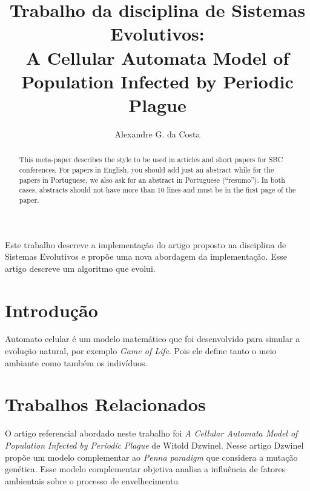 \documentclass[12pt]{article}
\title{Trabalho da disciplina de Sistemas Evolutivos:\\ A Cellular Automata
 Model of Population Infected by Periodic Plague}
\author{Alexandre G. da Costa\inst{1}}
\begin{document}
 

\maketitle

\begin{abstract}
  This meta-paper describes the style to be used in articles and short papers
  for SBC conferences. For papers in English, you should add just an abstract
  while for the papers in Portuguese, we also ask for an abstract in
  Portuguese (``resumo''). In both cases, abstracts should not have more than
  10 lines and must be in the first page of the paper.
\end{abstract}
  
\begin{resumo} 
  Este trabalho descreve a implementação do artigo proposto na disciplina de
  Sistemas Evolutivos e propõe uma nova abordagem da implementação. Esse
  artigo descreve um algoritmo que evolui.
\end{resumo}

\section{Introdução}

Automato celular é um modelo matemático que foi desenvolvido para simular a
evolução natural, por exemplo \textit{Game of Life}. Pois ele define tanto o
meio ambiante como também os indivíduos.


\section{Trabalhos Relacionados}

O artigo referencial abordado neste trabalho foi \textit{A Cellular Automata 
Model of Population Infected by Periodic Plague} de Witold Dzwinel. Nesse
artigo Dzwinel propõe um modelo complementar ao \textit{Penna paradigm}
\cite{almeida1998theoretical, de1998strategies} que considera a mutação
genética. Esse modelo complementar objetiva analisa a influência de fatores
ambientais sobre o processo de envelhecimento.
\end{document}
